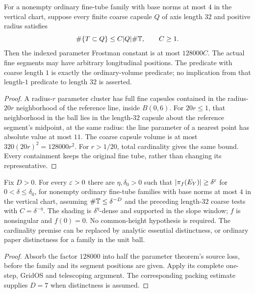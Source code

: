 \begin{lemma}
\label{lem:dilated-tube-cluster}
\leanok
{}
For a nonempty ordinary fine-tube family with base norms at most $4$
in the vertical chart, suppose every finite coarse capsule $Q$ of axis
length $32$ and positive radius satisfies
\[
             \#\{T\subset Q\}\leq C|Q|\#\mathbb{T},\qquad C\geq1.
\]
Then the indexed parameter Frostman constant is at most $128000C$.
The actual fine segments may have arbitrary longitudinal positions.
The predicate with coarse length $1$ is exactly the ordinary-volume
predicate; no implication from that length-$1$ predicate to length $32$
is asserted.
\end{lemma}
\begin{proof}
\leanok
A radius-$r$ parameter cluster has full fine capsules contained in the
radius-$20r$ neighborhood of the reference line, inside $B(0,6)$.
For $20r\leq1$, that neighborhood in the ball lies in the length-$32$
capsule about the reference segment's midpoint, at the same radius:
the line parameter of a nearest point has absolute value at most $11$.
The coarse capsule volume is at most $320(20r)^2=128000r^2$.
For $r>1/20$, total cardinality gives the same bound. Every containment
keeps the original fine tube, rather than changing its representative.
\end{proof}

\begin{theorem}
\label{thm:twisted-dilated}
\leanok
{}
Fix $D>0$. For every $\varepsilon>0$ there are $\eta,\delta_0>0$ such that
$|\pi_f(E_Y)|\geq\delta^\varepsilon$ for $0<\delta\leq\delta_0$, for
nonempty ordinary fine-tube families with base norms at most $4$ in
the vertical chart, assuming $\#\mathbb{T}\leq\delta^{-D}$ and the preceding
length-$32$ coarse tests with $C=\delta^{-\eta}$. The shading is
$\delta^\eta$-dense and supported in the slope window; $f$ is
nonsingular and $f(0)=0$. No common-height hypothesis is required.
The cardinality premise can be replaced by analytic essential distinctness,
or ordinary paper distinctness for a family in the unit ball.
\end{theorem}
\begin{proof}
\leanok
Absorb the factor $128000$ into half the parameter theorem's source loss,
before the family and its segment positions are given. Apply its complete
one-step, GridOS and telescoping argument. The corresponding packing
estimate supplies $D=7$ when distinctness is assumed.
\end{proof}

